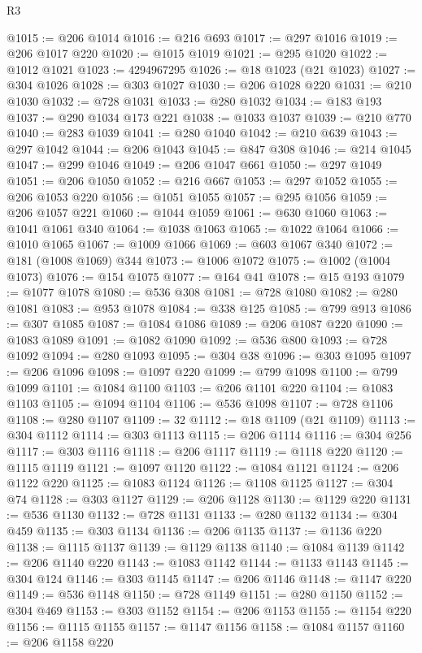 \begin{lexlean}{R3}
\begin{coremodule}
@1015 := @206 @1014
@1016 := @216 @693
@1017 := @297 @1016
@1019 := @206 @1017 @220
@1020 := @1015 @1019
@1021 := @295 @1020
@1022 := @1012 @1021
@1023 := 4294967295
@1026 := @18 @1023 (@21 @1023)
@1027 := @304 @1026
@1028 := @303 @1027
@1030 := @206 @1028 @220
@1031 := @210 @1030
@1032 := @728 @1031
@1033 := @280 @1032
@1034 := @183 @193
@1037 := @290 @1034 @173 @221
@1038 := @1033 @1037
@1039 := @210 @770
@1040 := @283 @1039
@1041 := @280 @1040
@1042 := @210 @639
@1043 := @297 @1042
@1044 := @206 @1043
@1045 := @847 @308
@1046 := @214 @1045
@1047 := @299 @1046
@1049 := @206 @1047 @661
@1050 := @297 @1049
@1051 := @206 @1050
@1052 := @216 @667
@1053 := @297 @1052
@1055 := @206 @1053 @220
@1056 := @1051 @1055
@1057 := @295 @1056
@1059 := @206 @1057 @221
@1060 := @1044 @1059
@1061 := @630 @1060
@1063 := @1041 @1061 @340
@1064 := @1038 @1063
@1065 := @1022 @1064
@1066 := @1010 @1065
@1067 := @1009 @1066
@1069 := @603 @1067 @340
@1072 := @181 (@1008 @1069) @344
@1073 := @1006 @1072
@1075 := @1002 (@1004 @1073)
@1076 := @154 @1075
@1077 := @164 @41
@1078 := @15 @193
@1079 := @1077 @1078
@1080 := @536 @308
@1081 := @728 @1080
@1082 := @280 @1081
@1083 := @953 @1078
@1084 := @338 @125
@1085 := @799 @913
@1086 := @307 @1085
@1087 := @1084 @1086
@1089 := @206 @1087 @220
@1090 := @1083 @1089
@1091 := @1082 @1090
@1092 := @536 @800
@1093 := @728 @1092
@1094 := @280 @1093
@1095 := @304 @38
@1096 := @303 @1095
@1097 := @206 @1096
@1098 := @1097 @220
@1099 := @799 @1098
@1100 := @799 @1099
@1101 := @1084 @1100
@1103 := @206 @1101 @220
@1104 := @1083 @1103
@1105 := @1094 @1104
@1106 := @536 @1098
@1107 := @728 @1106
@1108 := @280 @1107
@1109 := 32
@1112 := @18 @1109 (@21 @1109)
@1113 := @304 @1112
@1114 := @303 @1113
@1115 := @206 @1114
@1116 := @304 @256
@1117 := @303 @1116
@1118 := @206 @1117
@1119 := @1118 @220
@1120 := @1115 @1119
@1121 := @1097 @1120
@1122 := @1084 @1121
@1124 := @206 @1122 @220
@1125 := @1083 @1124
@1126 := @1108 @1125
@1127 := @304 @74
@1128 := @303 @1127
@1129 := @206 @1128
@1130 := @1129 @220
@1131 := @536 @1130
@1132 := @728 @1131
@1133 := @280 @1132
@1134 := @304 @459
@1135 := @303 @1134
@1136 := @206 @1135
@1137 := @1136 @220
@1138 := @1115 @1137
@1139 := @1129 @1138
@1140 := @1084 @1139
@1142 := @206 @1140 @220
@1143 := @1083 @1142
@1144 := @1133 @1143
@1145 := @304 @124
@1146 := @303 @1145
@1147 := @206 @1146
@1148 := @1147 @220
@1149 := @536 @1148
@1150 := @728 @1149
@1151 := @280 @1150
@1152 := @304 @469
@1153 := @303 @1152
@1154 := @206 @1153
@1155 := @1154 @220
@1156 := @1115 @1155
@1157 := @1147 @1156
@1158 := @1084 @1157
@1160 := @206 @1158 @220

\end{coremodule}
\end{lexlean}
